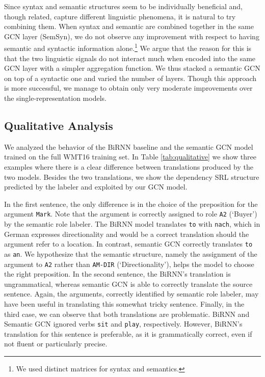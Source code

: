\documentclass[11pt,a4paper]{article}
\begin{document}
Since syntax and semantic structures seem to be individually beneficial and, though related, capture different linguistic phenomena, it is natural to try combining them.
When syntax and semantic are combined together in the same GCN layer (SemSyn),  we do not observe any improvement with respect to having semantic and syntactic information alone.\footnote{We used distinct  matrices  for syntax and semantics.}  
We argue that the reason for this is that the two linguistic signals do not interact much when encoded into the same GCN layer with a simpler aggregation function.
We thus stacked a semantic GCN on top of a syntactic one and varied the number of layers. 
Though this approach is more successful, we manage to obtain only very moderate improvements over the single-representation models.

\subsection{Qualitative Analysis}
We analyzed the behavior of the BiRNN baseline and the semantic GCN model trained on the full WMT16 training set.
In Table \ref{tab:qualitative} we show three examples where there is a clear difference between translations produced by the two models. Besides the two translations, we show the dependency SRL structure predicted by the labeler and exploited by our GCN model. 

In the first sentence, the only difference is in the choice of the preposition for the argument \texttt{Mark}. Note that the argument is correctly assigned to role \texttt{A2} (`Buyer') by the semantic role labeler. 
The BiRNN model translates \texttt{to} with \texttt{nach}, which in German expresses directionality and would be a correct translation should the argument refer to a location.
In contrast, semantic GCN correctly translates {\tt to} as \texttt{an}.
We hypothesize that the semantic structure, namely the assignment of the argument to {\tt A2} rather than {\tt AM-DIR} (`Directionality'), helps the model to choose the right preposition. 
In the second sentence, the BiRNN's translation is ungrammatical, whereas semantic GCN is able to correctly translate the source sentence. Again, the arguments, correctly identified by semantic role labeler, may have been useful in translating this somewhat tricky sentence.
Finally, in the third case, we can observe that both translations are problematic.
BiRNN and Semantic GCN ignored  verbs {\tt sit} and  {\tt play}, respectively.
However, BiRNN's translation for this sentence is preferable, as it is grammatically correct, even if not fluent or particularly precise.  
\end{document}
